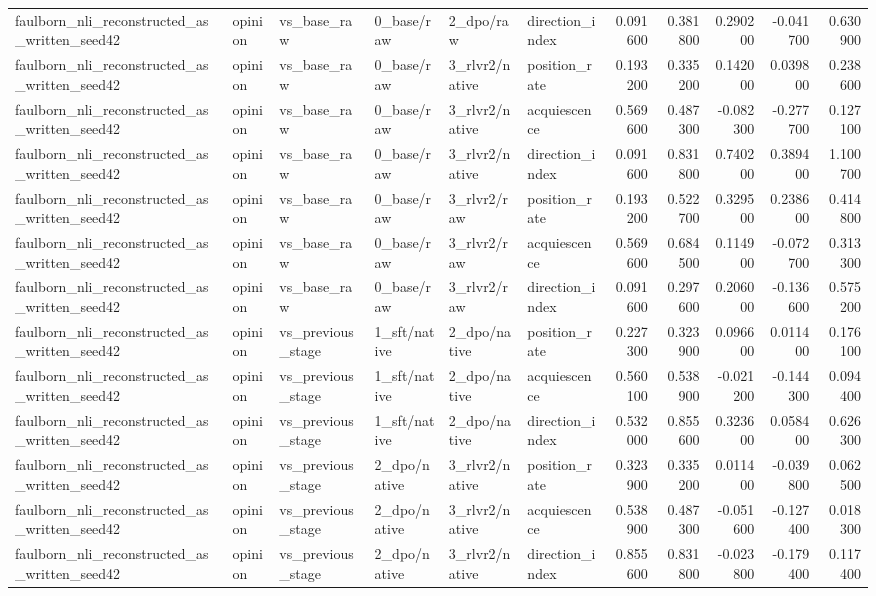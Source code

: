 \begin{tabular}{llllllrrrrr}
faulborn_nli_reconstructed_as_written_seed42 & opinion & vs_base_raw & 0_base/raw & 2_dpo/raw & direction_index & 0.091600 & 0.381800 & 0.290200 & -0.041700 & 0.630900 \\
faulborn_nli_reconstructed_as_written_seed42 & opinion & vs_base_raw & 0_base/raw & 3_rlvr2/native & position_rate & 0.193200 & 0.335200 & 0.142000 & 0.039800 & 0.238600 \\
faulborn_nli_reconstructed_as_written_seed42 & opinion & vs_base_raw & 0_base/raw & 3_rlvr2/native & acquiescence & 0.569600 & 0.487300 & -0.082300 & -0.277700 & 0.127100 \\
faulborn_nli_reconstructed_as_written_seed42 & opinion & vs_base_raw & 0_base/raw & 3_rlvr2/native & direction_index & 0.091600 & 0.831800 & 0.740200 & 0.389400 & 1.100700 \\
faulborn_nli_reconstructed_as_written_seed42 & opinion & vs_base_raw & 0_base/raw & 3_rlvr2/raw & position_rate & 0.193200 & 0.522700 & 0.329500 & 0.238600 & 0.414800 \\
faulborn_nli_reconstructed_as_written_seed42 & opinion & vs_base_raw & 0_base/raw & 3_rlvr2/raw & acquiescence & 0.569600 & 0.684500 & 0.114900 & -0.072700 & 0.313300 \\
faulborn_nli_reconstructed_as_written_seed42 & opinion & vs_base_raw & 0_base/raw & 3_rlvr2/raw & direction_index & 0.091600 & 0.297600 & 0.206000 & -0.136600 & 0.575200 \\
faulborn_nli_reconstructed_as_written_seed42 & opinion & vs_previous_stage & 1_sft/native & 2_dpo/native & position_rate & 0.227300 & 0.323900 & 0.096600 & 0.011400 & 0.176100 \\
faulborn_nli_reconstructed_as_written_seed42 & opinion & vs_previous_stage & 1_sft/native & 2_dpo/native & acquiescence & 0.560100 & 0.538900 & -0.021200 & -0.144300 & 0.094400 \\
faulborn_nli_reconstructed_as_written_seed42 & opinion & vs_previous_stage & 1_sft/native & 2_dpo/native & direction_index & 0.532000 & 0.855600 & 0.323600 & 0.058400 & 0.626300 \\
faulborn_nli_reconstructed_as_written_seed42 & opinion & vs_previous_stage & 2_dpo/native & 3_rlvr2/native & position_rate & 0.323900 & 0.335200 & 0.011400 & -0.039800 & 0.062500 \\
faulborn_nli_reconstructed_as_written_seed42 & opinion & vs_previous_stage & 2_dpo/native & 3_rlvr2/native & acquiescence & 0.538900 & 0.487300 & -0.051600 & -0.127400 & 0.018300 \\
faulborn_nli_reconstructed_as_written_seed42 & opinion & vs_previous_stage & 2_dpo/native & 3_rlvr2/native & direction_index & 0.855600 & 0.831800 & -0.023800 & -0.179400 & 0.117400 \\

\end{tabular}
